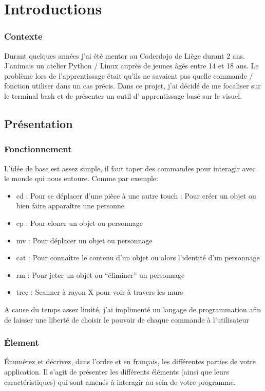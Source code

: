 \documentclass{report}
\begin{document}
\part{Introductions}

\section*{Contexte}
Durant quelques années j’ai été mentor au Coderdojo de Liège durant 2 ans. J’animais un atelier Python / Linux auprès de jeunes âgés entre 14 et 18 ans. Le problème lors de l’apprentissage était qu’ils ne savaient pas quelle commande / fonction utiliser dans un cas précis. Dans ce projet, j’ai décidé de me focaliser sur le terminal bash et de présenter un outil d’ apprentissage basé sur le visuel.
\chapter{Présentation}
\section{Fonctionnement}
L’idée de base est assez simple, il faut taper des commandes pour interagir avec le monde qui nous entoure.
\newline
\newline
Comme par exemple:

\begin {itemize}
  \item cd  : Pour se déplacer d’une pièce à une autre
  touch : Pour créer un objet ou bien faire apparaître une personne
  \item cp : Pour cloner un objet ou personnage
  \item mv : Pour déplacer un objet ou personnage
  \item cat : Pour connaître le contenu d’un objet ou alors l'identité d’un personnage
  \item rm : Pour jeter un objet ou “éliminer” un personnage
  \item tree : Scanner à rayon X pour voir à travers les murs
\end {itemize}

A cause du temps assez limité, j'ai implimenté un langage de programmation afin de laisser une liberté de choisir le pouvoir de chaque commande à l'utilisateur

\section{Élement}
Énumérez et décrivez, dans l’ordre et en français, les différentes parties de votre application. Il s’agit de présenter les différents éléments (ainsi que leurs caractéristiques) qui sont amenés à interagir au sein de votre programme.
\end{document}
